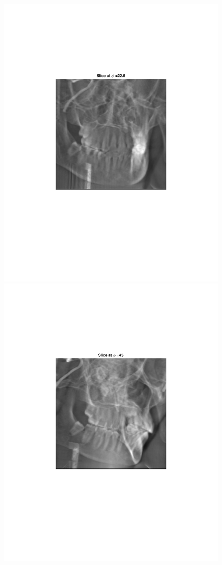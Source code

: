 \documentclass{UCF_ETD}
\begin{document}
\begin{figure}[H]
\begin{center}
\includegraphics[scale=0.5]{FVR/CompCT_2Slice23}
\includegraphics[scale=0.5]{FVR/CompCT_2Slice45} 

\end{center}
\end{figure}
\end{document}
